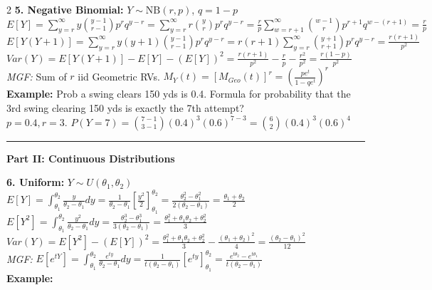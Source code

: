 \documentclass[10pt]{article}
\begin{document}
\begin{multicols*}{2}
\vspace{2mm}
\textbf{5. Negative Binomial:} $Y \sim \text{NB}(r, p)$, $q = 1-p$\\
$E[Y] = \sum_{y=r}^{\infty} y \binom{y-1}{r-1} p^r q^{y-r} = \sum_{y=r}^{\infty} r \binom{y}{r} p^r q^{y-r} = \frac{r}{p} \sum_{w=r+1}^{\infty} \binom{w-1}{r} p^{r+1} q^{w-(r+1)} = \frac{r}{p}$\\
$E[Y(Y+1)] = \sum_{y=r}^{\infty} y(y+1)\binom{y-1}{r-1}p^r q^{y-r} = r(r+1)\sum_{y=r}^{\infty} \binom{y+1}{r+1} p^r q^{y-r} = \frac{r(r+1)}{p^2}$\\
$Var(Y) = E[Y(Y+1)] - E[Y] - (E[Y])^2 = \frac{r(r+1)}{p^2} - \frac{r}{p} - \frac{r^2}{p^2} = \frac{r(1-p)}{p^2}$\\
\textit{MGF:} Sum of $r$ iid Geometric RVs. $M_Y(t) = [M_{Geo}(t)]^r = \left(\frac{pe^t}{1-qe^t}\right)^r$\\
\textbf{Example:} Prob a swing clears 150 yds is 0.4. Formula for probability that the 3rd swing clearing 150 yds is exactly the 7th attempt?\\
$p=0.4, r=3$. $P(Y=7) = \binom{7-1}{3-1}(0.4)^3 (0.6)^{7-3} = \binom{6}{2}(0.4)^3(0.6)^4$

\vspace{2mm}
\hrule
\vspace{2mm}

\textbf{\Large Part II: Continuous Distributions}

\textbf{6. Uniform:} $Y \sim U(\theta_1, \theta_2)$\\
$E[Y] = \int_{\theta_1}^{\theta_2} \frac{y}{\theta_2 - \theta_1} dy = \frac{1}{\theta_2 - \theta_1} \left[\frac{y^2}{2}\right]_{\theta_1}^{\theta_2} = \frac{\theta_2^2 - \theta_1^2}{2(\theta_2 - \theta_1)} = \frac{\theta_1 + \theta_2}{2}$\\
$E[Y^2] = \int_{\theta_1}^{\theta_2} \frac{y^2}{\theta_2 - \theta_1} dy = \frac{\theta_2^3 - \theta_1^3}{3(\theta_2 - \theta_1)} = \frac{\theta_1^2 + \theta_1\theta_2 + \theta_2^2}{3}$\\
$Var(Y) = E[Y^2] - (E[Y])^2 = \frac{\theta_1^2 + \theta_1\theta_2 + \theta_2^2}{3} - \frac{(\theta_1 + \theta_2)^2}{4} = \frac{(\theta_2 - \theta_1)^2}{12}$\\
\textit{MGF:} $E[e^{tY}] = \int_{\theta_1}^{\theta_2} \frac{e^{ty}}{\theta_2 - \theta_1} dy = \frac{1}{t(\theta_2 - \theta_1)} [e^{ty}]_{\theta_1}^{\theta_2} = \frac{e^{t\theta_2} - e^{t\theta_1}}{t(\theta_2 - \theta_1)}$\\
\textbf{Example:} 
\vspace{1.2cm}


\end{multicols*}
\end{document}
